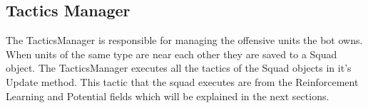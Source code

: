 	\subsection{Tactics Manager}
		The TacticsManager is responsible for managing the offensive units the bot owns. When units of the same type are near each other they are saved 
		to a Squad object. The TacticsManager executes all the tactics of the Squad objects in it's Update method. This tactic that the squad executes 
		are from the Reinforcement Learning and Potential fields which will be explained in the next sections.
		
			
		
			
			
				
			
		
